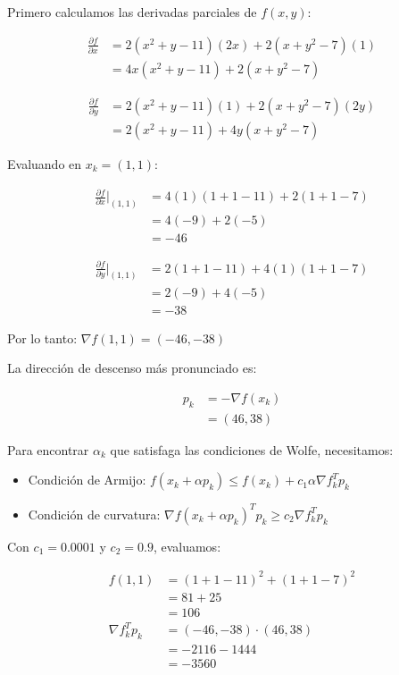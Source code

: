 \documentclass{article}
\begin{document}
Primero calculamos las derivadas parciales de $f(x,y)$:

\begin{align}
    \frac{\partial f}{\partial x} &= 2(x^2+y-11)(2x) + 2(x+y^2-7)(1) \\
    &= 4x(x^2+y-11) + 2(x+y^2-7)
\end{align}

\begin{align}
    \frac{\partial f}{\partial y} &= 2(x^2+y-11)(1) + 2(x+y^2-7)(2y) \\
    &= 2(x^2+y-11) + 4y(x+y^2-7)
\end{align}

Evaluando en $x_k = (1,1)$:

\begin{align}
    \frac{\partial f}{\partial x}\bigg|_{(1,1)} &= 4(1)(1+1-11) + 2(1+1-7) \\
    &= 4(-9) + 2(-5) \\
    &= -46
\end{align}

\begin{align}
    \frac{\partial f}{\partial y}\bigg|_{(1,1)} &= 2(1+1-11) + 4(1)(1+1-7) \\
    &= 2(-9) + 4(-5) \\
    &= -38
\end{align}

Por lo tanto: $\nabla f(1,1) = (-46, -38)$

La dirección de descenso más pronunciado es:

\begin{align}
    p_k &= -\nabla f(x_k) \\
    &= (46, 38)
\end{align}

Para encontrar $\alpha_k$ que satisfaga las condiciones de Wolfe, necesitamos:
\begin{itemize}
    \item Condición de Armijo: $f(x_k + \alpha p_k) \leq f(x_k) + c_1 \alpha \nabla f_k^T p_k$
    \item Condición de curvatura: $\nabla f(x_k + \alpha p_k)^T p_k \geq c_2 \nabla f_k^T p_k$
\end{itemize}

Con $c_1 = 0.0001$ y $c_2 = 0.9$, evaluamos:

\begin{align}
    f(1,1) &= (1+1-11)^2 + (1+1-7)^2 \\
    &= 81 + 25 \\
    &= 106 \\
    \nabla f_k^T p_k &= (-46, -38) \cdot (46, 38) \\
    &= -2116 - 1444  \\
    &= -3560
\end{align}
\end{document}
